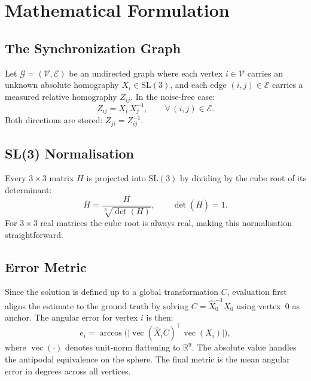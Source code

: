 \documentclass[11pt, a4paper]{article}
\begin{document}
\section{Mathematical Formulation}
\label{sec:formulation}

\subsection{The Synchronization Graph}

Let $\mathcal{G} = (\mathcal{V}, \mathcal{E})$ be an undirected graph where
each vertex $i \in \mathcal{V}$ carries an unknown absolute homography
$X_i \in \mathrm{SL}(3)$, and each edge $(i,j) \in \mathcal{E}$ carries a
measured relative homography $Z_{ij}$.  In the noise-free case:
\begin{equation}
    Z_{ij} = X_i \, X_j^{-1}, \qquad \forall\,(i,j) \in \mathcal{E}.
    \label{eq:consistency}
\end{equation}
Both directions are stored: $Z_{ji} = Z_{ij}^{-1}$.

\subsection{SL(3) Normalisation}

Every $3\times3$ matrix $H$ is projected into $\mathrm{SL}(3)$ by dividing by
the cube root of its determinant:
\begin{equation}
    \bar{H} = \frac{H}{\sqrt[3]{\det(H)}}, \qquad \det(\bar{H}) = 1.
\end{equation}
For $3\times3$ real matrices the cube root is always real, making this
normalisation straightforward.

\subsection{Error Metric}

Since the solution is defined up to a global transformation $C$, evaluation
first aligns the estimate to the ground truth by solving $C = \hat{X}_0^{-1}
X_0$ using vertex~$0$ as anchor.  The angular error for vertex $i$ is then:
\begin{equation}
    e_i = \arccos\!\Big(\big|\operatorname{vec}(\hat{X}_i C)^\top
          \operatorname{vec}(X_i)\big|\Big),
    \label{eq:angular_error}
\end{equation}
where $\operatorname{vec}(\cdot)$ denotes unit-norm flattening to $\mathbb{R}^9$.
The absolute value handles the antipodal equivalence on the sphere.  The final
metric is the mean angular error in degrees across all vertices.
\end{document}
